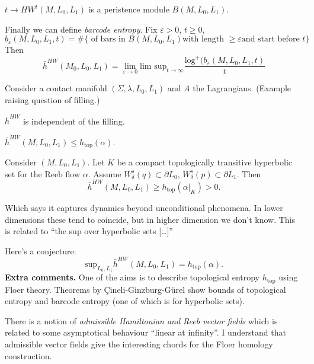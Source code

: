 \begin{proposition}
\label{proposition-persistence-module}
$t \to HW^t(M,L_0,L_1)$ is a peristence
module $B(M,L_0,L_1).$
\end{proposition}

Finally we can define {\it barcode entropy}.
Fix $\varepsilon>0$,
$t \geq 0$,
$$
b_\varepsilon(M,L_0,L_1,t)=
\# \{\text{ of bars in }B(M,L_0,L_1)
\text{with length $\geq \varepsilon$
and start before $t$}\}
$$
Then
$$
\bar{h}^{HW}(M_0,L_0,L_1)=
\lim_{\varepsilon \to 0} \text{lim sup}_{t
\to \infty}
\frac{\text{log}^+(b_\varepsilon(M,L_0,L_1,t)
}{t}
$$

\medskip\noindent
Consider a contact manifold
$(\Sigma,\lambda,L_0,L_1)$
and $A$ the Lagrangians. (Example raising
question of filling.)

\begin{theorem}[M '24]
\label{theorem-entro-indep-filli}
$\bar{h}^{HW}$ is independent of the filling.
\end{theorem}

\begin{theorem}[M '24]
\label{theorem-bound}
$\bar{h}^{HW}(M,L_0,L_1) \leq
h_{\text{top}}(\alpha)$.
\end{theorem}

\begin{theorem}[M '25]
\label{theorem-restriction}
Consider $(M,L_0,L_1)$.
Let $K$ be a compact topologically transitive
hyperbolic set
for the Reeb flow $\alpha$. Assume $W_\delta
^s (q) \subset \partial L_0$,
$W_\delta^s(p) \subset \partial L_1$. Then
$$
\bar{h}^{HW}(M,L_0,L_1)\geq
h_{\text{top}}(\alpha |_{K})>0.
$$
\end{theorem}
Which says it captures dynamics beyond
unconditional phenomena.
In lower dimensions these tend to coincide,
but in higher dimension we don't
know. This is related to
 ``the sup over hyperbolic sets […]''

Here's a conjecture:
$$
\text{sup}_{L_0,L_1}\bar{h}^{HW}(M,L_0,L_1)=
h_{\text{top}}(\alpha).
$$
\medskip\noindent
{\bf Extra comments.}
One of the aims is to describe topological
entropy $h_\text{top}$
using Floer theory. Theorems by
Çineli-Ginzburg-Gürel show bounds
of topological entropy and barcode entropy
(one of which is for
hyperbolic sets).

There is a notion of  {\it admissible
Hamiltonian and Reeb vector fields}
which is related to some asymptotical
behaviour  ``linear at infinity''.
I understand that admissible vector fields
give
the interesting chords for the Floer homology
construction.

